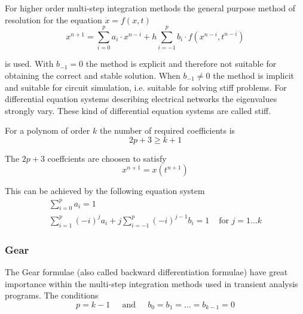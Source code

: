 \documentclass[10pt]{report}
\begin{document}
For higher order multi-step integration methods the general purpose
method of resolution for the equation $\dot{x} = f(x,t)$
\begin{equation}
\label{eq:GenPurposeInt}
x^{n+1} = \sum^p_{i=0} a_i\cdot x^{n-i} + h \sum^p_{i=-1} b_i\cdot f(x^{n-i}, t^{n-i})
\end{equation}

is used.  With $b_{-1} = 0$ the method is explicit and therefore not
suitable for obtaining the correct and stable solution.  When $b_{-1}
\ne 0$ the method is implicit and suitable for circuit simulation,
i.e. suitable for solving stiff problems.  For differential equation
systems describing electrical networks the eigenvalues strongly vary.
These kind of differential equation systems are called stiff.

\addvspace{12pt}

For a polynom of order $k$ the number of required coefficients is
\begin{equation}
2p + 3 \ge k + 1
\end{equation}

The $2p +3$ coeffcients are choosen to satisfy
\begin{equation}
x^{n+1} = x(t^{n+1})
\end{equation}

This can be achieved by the following equation system
\begin{equation}
\begin{split}
\label{eq:MultiStepSys}
\sum^p_{i=0} a_i = 1\\
\sum^p_{i=1} (-i)^j a_i + j \sum^p_{i=-1} (-i)^{j-1} b_i = 1 & \textrm{ for } j = 1\ldots k
\end{split}
\end{equation}

\subsubsection{Gear}

The Gear formulae (also called backward differentiation formulae) have
great importance within the multi-step integration methods used in
transient analysis programs.  The conditions
\begin{equation}
p = k - 1
\;\;\;\; \textrm{ and } \;\;\;\;
b_0 = b_1 = \ldots = b_{k-1} = 0
\end{equation}
\end{document}
